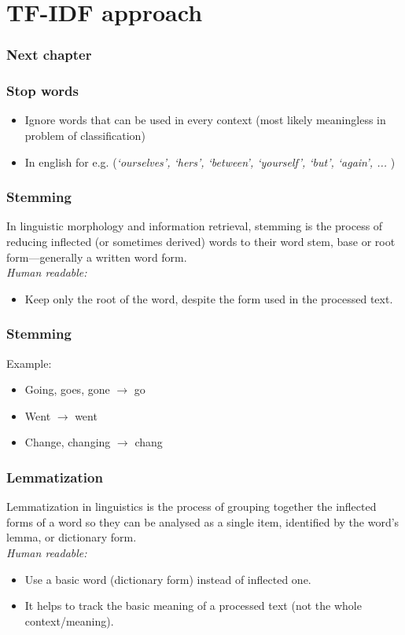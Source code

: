 \documentclass{beamer}
\begin{document}
    \section{TF-IDF approach}
    \begin{frame}
    	\frametitle{Next chapter}
        \tableofcontents[currentsection]
    \end{frame}
    \begin{frame}
    	\frametitle{Stop words}
        \begin{itemize}
            \item Ignore words that can be used in every context (most likely meaningless in problem of classification)
            \item In english for e.g. (\textit{‘ourselves’, ‘hers’, ‘between’, ‘yourself’, ‘but’, ‘again’, ... })
        \end{itemize}
    \end{frame}
    \begin{frame}
        \frametitle{Stemming}
        In linguistic morphology and information retrieval, stemming is the process of reducing inflected
        (or sometimes derived) words to their word stem, base or root form—generally a written word form. \\
        \textit{Human readable:}
        \begin{itemize}
            \item Keep only the root of the word, despite the form used in the processed text.
        \end{itemize}
    \end{frame}
    \begin{frame}
        \frametitle{Stemming}
        Example:
        \begin{itemize}
            \item Going, goes, gone $\rightarrow$ go
            \item Went $\rightarrow$ went
            \item Change, changing $\rightarrow$ chang
        \end{itemize}
    \end{frame}
    \begin{frame}
        \frametitle{Lemmatization}
        Lemmatization in linguistics is the process of grouping together the inflected
        forms of a word so they can be analysed as a single item, identified by the word's lemma, or dictionary form. \\
        \textit{Human readable:}
        \begin{itemize}
            \item Use a basic word (dictionary form) instead of inflected one.
            \item It helps to track the basic meaning of a processed text (not the whole context/meaning).
        \end{itemize}
    \end{frame}
\end{document}
